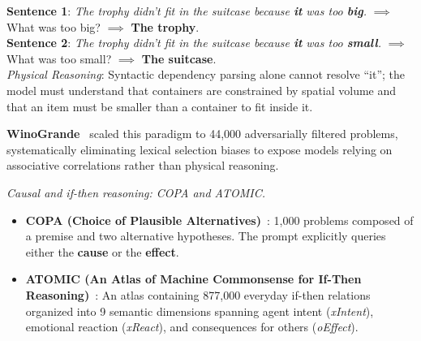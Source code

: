 \documentclass[../../../main.tex]{subfiles}
\begin{document}
\begin{center}
\begin{minipage}{0.95\textwidth}
\begin{tcolorbox}[colback=cardBg,colframe=cardLine,arc=2pt,boxrule=0.5pt,title=\textbf{Task Example: Pronoun Coreference Ambiguity (WSC Twin Sentences)}]
\small\sffamily
\textbf{Sentence 1}: \textit{The trophy didn't fit in the suitcase because \textbf{it} was too \textbf{big}.} $\implies$ What was too big? $\implies$ \textbf{The trophy}. \\
\textbf{Sentence 2}: \textit{The trophy didn't fit in the suitcase because \textbf{it} was too \textbf{small}.} $\implies$ What was too small? $\implies$ \textbf{The suitcase}. \\
\textit{Physical Reasoning}: Syntactic dependency parsing alone cannot resolve ``it''; the model must understand that containers are constrained by spatial volume and that an item must be smaller than a container to fit inside it.
\end{tcolorbox}
\end{minipage}
\end{center}

\textbf{WinoGrande}~\cite{sakaguchi2020winogrande} scaled this paradigm to 44,000 adversarially filtered problems, systematically eliminating lexical selection biases to expose models relying on associative correlations rather than physical reasoning.

\textit{Causal and if-then reasoning: COPA and ATOMIC.}
\begin{itemize}
    \item \textbf{COPA (Choice of Plausible Alternatives)}~\cite{roemmele2011copa}: 1,000 problems composed of a premise and two alternative hypotheses. The prompt explicitly queries either the \textbf{cause} or the \textbf{effect}.
    \item \textbf{ATOMIC (An Atlas of Machine Commonsense for If-Then Reasoning)}~\cite{sap2019atomic}: An atlas containing 877,000 everyday if-then relations organized into 9 semantic dimensions spanning agent intent (\textit{xIntent}), emotional reaction (\textit{xReact}), and consequences for others (\textit{oEffect}).
\end{itemize}
\end{document}
